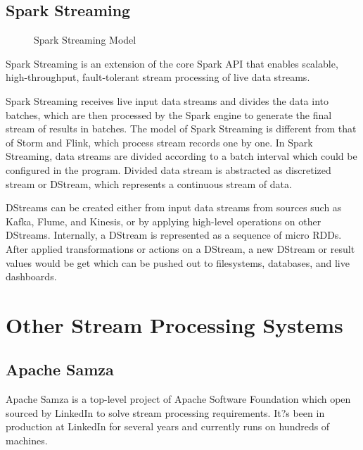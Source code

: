 \subsection{Spark Streaming}
\begin{figure}
  \begin{center}
   \caption{Spark Streaming Model}
   \label{fig:spark_stream}
  \end{center}
\end{figure}

Spark Streaming is an extension of the core Spark API that enables scalable, high-throughput, fault-tolerant stream processing of live data streams. 

Spark Streaming receives live input data streams and divides the data into batches, which are then processed by the Spark engine to generate the final stream of results in batches. The model of Spark Streaming is different from that of Storm and Flink, which process stream records one by one. In Spark Streaming, data streams are divided according to a batch interval which could be configured in the program. Divided data stream is abstracted as discretized stream or DStream, which represents a continuous stream of data. 

DStreams can be created either from input data streams from sources such as Kafka, Flume, and Kinesis, or by applying high-level operations on other DStreams. Internally, a DStream is represented as a sequence of micro RDDs. After applied transformations or actions on a DStream,   a new DStream or result values would be get which can be pushed out to filesystems, databases, and live dashboards.

\section{Other Stream Processing Systems}
\subsection{Apache Samza}
Apache Samza is a top-level project of Apache Software Foundation which open sourced by LinkedIn to solve stream processing requirements. It?s been in production at LinkedIn for several years and currently runs on hundreds of machines. 

